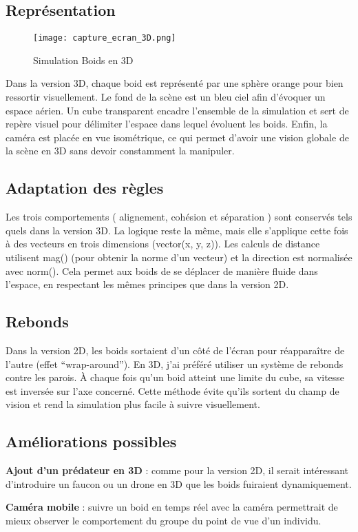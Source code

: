\documentclass{article}
\begin{document}
\subsection{Représentation}
\begin{figure}
    \centering
    \texttt{[image: capture\_ecran\_3D.png]}
    \caption{Simulation Boids en 3D}
    \label{fig:enter-label}
\end{figure}
Dans la version 3D, chaque boid est représenté par une sphère orange pour bien ressortir visuellement. Le fond de la scène est un bleu ciel afin d’évoquer un espace aérien. Un cube transparent encadre l’ensemble de la simulation et sert de repère visuel pour délimiter l’espace dans lequel évoluent les boids. Enfin, la caméra est placée en vue isométrique, ce qui permet d’avoir une vision globale de la scène en 3D sans devoir constamment la manipuler.
\subsection{Adaptation des règles}
Les trois comportements ( alignement, cohésion et séparation ) sont conservés tels quels dans la version 3D. La logique reste la même, mais elle s’applique cette fois à des vecteurs en trois dimensions (vector(x, y, z)). Les calculs de distance utilisent mag() (pour obtenir la norme d’un vecteur) et la direction est normalisée avec norm(). Cela permet aux boids de se déplacer de manière fluide dans l’espace, en respectant les mêmes principes que dans la version 2D.
\subsection{Rebonds}
Dans la version 2D, les boids sortaient d’un côté de l’écran pour réapparaître de l’autre (effet “wrap-around”). En 3D, j’ai préféré utiliser un système de rebonds contre les parois. À chaque fois qu’un boid atteint une limite du cube, sa vitesse est inversée sur l’axe concerné. Cette méthode évite qu’ils sortent du champ de vision et rend la simulation plus facile à suivre visuellement.
\subsection{Améliorations possibles}
\textbf{Ajout d’un prédateur en 3D} : comme pour la version 2D, il serait intéressant d’introduire un faucon ou un drone en 3D que les boids fuiraient dynamiquement.

\textbf{Caméra mobile} : suivre un boid en temps réel avec la caméra permettrait de mieux observer le comportement du groupe du point de vue d’un individu.
\end{document}
